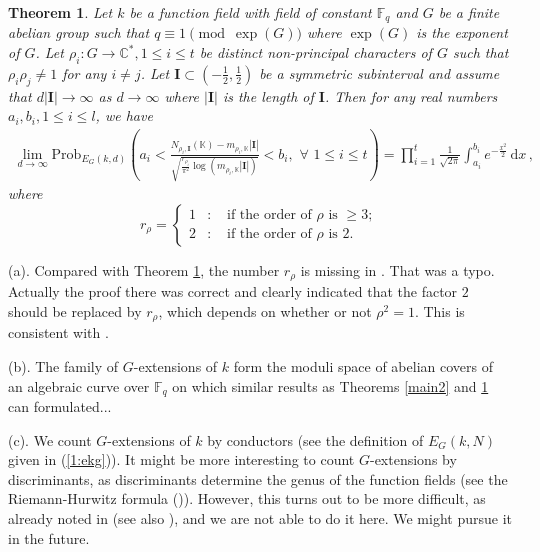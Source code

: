 \documentclass[12pt]{amsart}
\theoremstyle{plain}
\newtheorem{thm}{Theorem}
\begin{document}
\begin{thm} \label{main} Let $k$ be a function field with field of constant ${{\mathbb F}_q}$ and $G$ be a finite abelian group such that $q \equiv 1 \pmod{\exp(G)}$ where $\exp(G)$ is the exponent of $G$. Let $\rho_i: G \to {{\mathbb C}}^*, 1 \le i \le t$ be distinct non-principal characters of $G$ such that $\rho_i \rho_j \ne 1$ for any $i \ne j$. Let ${{\mathbf I}} \subset \left(-\frac{1}{2},\frac{1}{2}\right)$ be a symmetric subinterval and assume that $d |{{\mathbf I}}| \to \infty$ as $d \to \infty$ where $|{{\mathbf I}}|$ is the length of ${{\mathbf I}}$. Then for any real numbers $a_i,b_i, 1 \le i \le l$, we have
\begin{eqnarray*} \lim_{d \to \infty} {\mathrm{Prob}}_{E_G(k,d)} \left(a_i<\frac{N_{\rho_i,{{\mathbf I}}}({{\mathbb K}})-m_{\rho_i,{{\mathbb K}}}|{{\mathbf I}}|}{\sqrt{\frac{r_{\rho_i}}{\pi^2} \log (m_{\rho_i,{{\mathbb K}}} |{{\mathbf I}}|)}}<b_i, \,\, \forall \,\, 1 \le i \le t \right) =\prod_{i=1}^t \frac{1}{\sqrt{2 \pi}} \int_{a_i}^{b_i} e^{-\frac{x^2}{2}} \, {\mathrm{d}} x \,,\end{eqnarray*}
where
\[r_{\rho}=\left\{\begin{array}{lll}
1&:& \mbox{ if the order of } \rho \mbox{ is } \ge 3;\\
2&:& \mbox{ if the order of } \rho \mbox{ is } 2.
\end{array}\right.\]
\end{thm}

 (a). Compared with Theorem \ref{main}, the number $r_{\rho}$ is missing in \cite[Theorem 1]{xio}. That was a typo. Actually the proof there was correct and clearly indicated that the factor $2$ should be replaced by $r_{\rho}$, which depends on whether or not $\rho^2=1$. This is consistent with \cite{fai,buc3}.

(b). The family of $G$-extensions of $k$ form the moduli space of abelian covers of an algebraic curve over ${{\mathbb F}_q}$ on which similar results as Theorems \ref{main2} and \ref{main} can formulated...

(c). We count $G$-extensions of $k$ by conductors (see the definition of $E_G(k,N)$ given in (\ref{1:ekg})). It might be more interesting to count $G$-extensions by discriminants, as discriminants determine the genus of the function fields (see the Riemann-Hurwitz formula (\cite[Theorem 7.16]{ros})). However, this turns out to be more difficult, as already noted in \cite{woo} (see also \cite{wri}), and we are not able to do it here. We might pursue it in the future.
\end{document}
